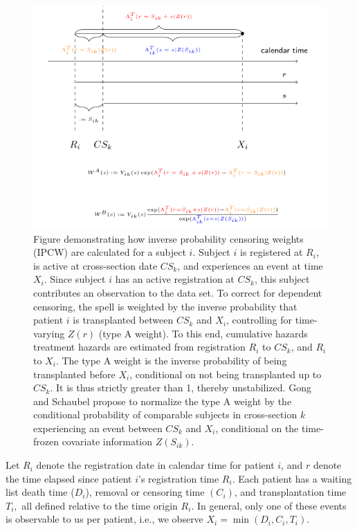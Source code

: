 \documentclass[11pt,twoside,]{book}
\begin{document}
\begin{figure}[h]

{\centering \includegraphics[width=0.95\linewidth]{figures/appendix//gong_schaubel_ipcw} 

}

\caption{Figure demonstrating how inverse probability censoring
weights (IPCW) are calculated for a subject $i$. Subject $i$ is
registered at $R_{i}$, is active at cross-section date $CS_{k}$, and
experiences an event at time $X_{i}$. Since subject $i$ has an active
registration at $CS_{k}$, this subject contributes an observation to the
data set. To correct for dependent censoring, the spell is weighted by
the inverse probability that patient $i$ is transplanted between
$CS_{k}$ and $X_{i}$, controlling for time-varying $Z( r )$
(type A weight). To this end, cumulative hazards treatment hazards are
estimated from registration $R_{i}$ to $CS_{k}$, and $R_{i}$ to $X_{i}$.
The type A weight is the inverse probability of being transplanted
before $X_{i}$, conditional on not being transplanted up to $CS_{k}$. It
is thus strictly greater than 1, thereby unstabilized. Gong and Schaubel
propose to normalize the type A weight by the conditional probability of
comparable subjects in cross-section $k$ experiencing an event between
$CS_{k}$ and $X_{i}$, conditional on the time-frozen covariate
information $Z( S_{ik} )$.}\label{fig:appfig1}
\end{figure}

Let \(R_{i}\) denote the registration date in calendar time for patient \(i\),
and \(r\) denote the time elapsed since patient \(i\)'s registration time \(R_{i}\).
Each patient has a waiting list death time (\(D_{i}\)), removal or censoring time
\(( C_{i} )\), and transplantation time \(T_{i},\) all defined
relative to the time origin \(R_{i}\). In general, only one of these events is
observable to us per patient, i.e., we observe \(X_{i} = \min( D_{i},C_{i},T_{i} )\).
\end{document}
